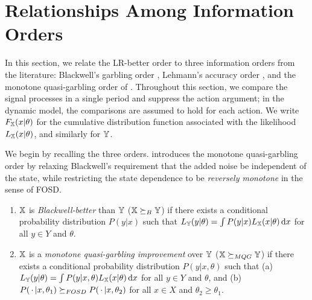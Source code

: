 \section{Relationships Among Information Orders}\label{sec:orders}

In this section, we relate the LR-better order to three information
orders from the literature: Blackwell's garbling order
\citep{blackwell1951comparison}, Lehmann's accuracy order
\citep{lehmann1988comparing}, and the monotone quasi-garbling order of
\citet{kim2023comparing}. Throughout this section, we compare the
signal processes in a single period and suppress the action argument;
in the dynamic model, the comparisons are assumed to hold for each
action. We write $F_{\mathbb{X}}(x|\theta)$ for the cumulative distribution
function associated with the likelihood $L_{\mathbb{X}}(x|\theta)$, and
similarly for ${\mathbb{Y}}$.

We begin by recalling the three orders. \citet{kim2023comparing}
introduces the monotone quasi-garbling order by relaxing Blackwell's
requirement that the added noise be independent of the state, while
restricting the state dependence to be \emph{reversely monotone} in
the sense of FOSD.

\begin{definition}\label{def:BW-MQG}\quad
\begin{enumerate}
\item \citep{blackwell1951comparison} ${\mathbb{X}}$ is \emph{Blackwell-better}
  than ${\mathbb{Y}}$ (${\mathbb{X}} \succeq_{B} {\mathbb{Y}}$) if there exists a conditional probability
  distribution $P(y|x)$ such that
  $L_{\mathbb{Y}}(y|\theta) = \int P(y|x) L_{\mathbb{X}}(x|\theta) \mathop{}\!\mathrm{d} x$ for all
  $y \in Y$ and $\theta$.
\item \citep[Definition~3]{kim2023comparing} ${\mathbb{X}}$ is a \emph{monotone
  quasi-garbling improvement} over ${\mathbb{Y}}$ (${\mathbb{X}} \succeq_{MQG} {\mathbb{Y}}$) if there
  exists a conditional probability distribution $P(y|x,\theta)$ such
  that (a) $L_{\mathbb{Y}}(y|\theta) = \int P(y|x,\theta) L_{\mathbb{X}}(x|\theta)
  \mathop{}\!\mathrm{d} x$ for all $y \in Y$ and $\theta$, and (b)
  $P(\,\cdot\,|x,\theta_1) \succeq_{FOSD} P(\,\cdot\,|x,\theta_2)$ for all
  $x \in X$ and $\theta_2 \geq \theta_1$.
\end{enumerate}
\end{definition}

